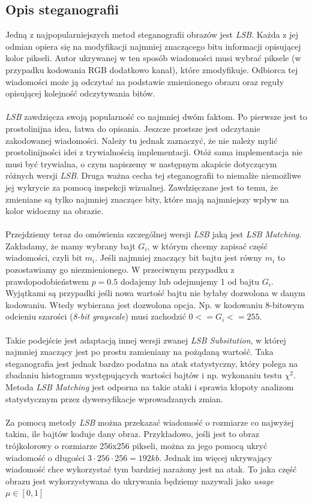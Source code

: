 \subsection{Opis steganografii}
        Jedną z najpopularniejszych metod steganografii obrazów jest \textit{LSB}\cite{kombrink}. Każda z jej odmian opiera się na modyfikacji najmniej znaczącego bitu informacji opisującej kolor pikseli. Autor ukrywanej w ten sposób wiadomości musi wybrać piksele (w przypadku kodowania RGB dodatkowo kanał), które zmodyfikuje. Odbiorca tej wiadomości może ją odczytać na podstawie zmienionego obrazu oraz reguły opisującej kolejność odczytywania bitów. \\
        \\
        \textit{LSB} zawdzięcza swoją popularność co najmniej dwóm faktom. Po pierwsze jest to prostolinijna idea, łatwa do opisania. Jeszcze prostsze jest odczytanie zakodowanej wiadomości. Należy tu jednak zaznaczyć, że nie należy mylić prostolinijności idei z trywialnością implementacji. Otóż sama implementacja nie musi być trywialna, o czym napiszemy w następnym akapicie dotyczącym różnych wersji \textit{LSB}. Druga ważna cecha tej steganografii to niemalże niemożliwe jej wykrycie za pomocą inspekcji wizualnej. Zawdzięczane jest to temu, że zmieniane są tylko najmniej znaczące bity, które mają najmniejszy wpływ na kolor widoczny na obrazie.\\
        \\
        Przejdziemy teraz do omówienia szczególnej wersji \textit{LSB} jaką jest \textit{LSB Matching}. Zakładamy, że mamy wybrany bajt $G_i$, w którym chcemy zapisać część wiadomości, czyli bit $m_i$. Jeśli najmniej znaczący bit bajtu jest równy $m_i$ to pozostawiamy go niezmienionego. W przeciwnym przypadku z prawdopodobieństwem $p=0.5$ dodajemy lub odejmujemy 1 od bajtu $G_i$. Wyjątkami są przypadki jeśli nowa wartość bajtu nie byłaby dozwolona w danym kodowaniu. Wtedy wybierana jest dozwolona opcja. Np. w kodowaniu 8-bitowym odcieniu szarości (\textit{8-bit grayscale}) musi zachodzić $0 <= G_i <= 255$. \cite{sarkar} \\
        \\
        Takie podejście jest adaptacją innej wersji zwanej \textit{LSB Subsitution}, w której najmniej znaczący jest po prostu zamieniany na pożądaną wartość. Taka steganografia jest jednak bardzo podatna na atak statystyczny, który polega na zbadaniu histogramu występujących wartości bajtów i np. wykonaniu testu $\chi ^2$. Metoda \textit{LSB Matching} jest odporna na takie ataki i sprawia kłopoty analizom statystycznym przez dywersyfikacje wprowadzanych zmian.\cite{daniel, sarkar} \\
        \\
        Za pomocą metody \textit{LSB} można przekazać wiadomość o rozmiarze co najwyżej takim, ile bajtów koduje dany obraz. Przykładowo, jeśli jest to obraz trójkolorowy o rozmiarze 256x256 pikseli, można za jego pomocą ukryć wiadomość o długości $3\cdot 256 \cdot 256=192kb$. Jednak im więcej ukrywający wiadomość chce wykorzystać tym bardziej narażony jest na atak. To jaka część obrazu jest wykorzystywana do ukrywania będziemy nazywali jako \textit{usage} $\mu \in \left[ 0, 1 \right]$
    
